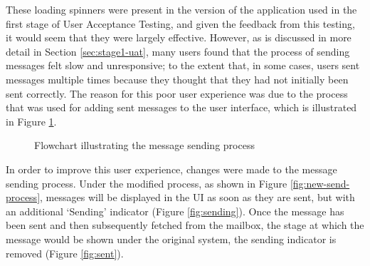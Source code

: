 These loading spinners were present in the version of the application used in the first stage of User Acceptance Testing, and given the feedback from this testing, it would seem that they were largely effective. However, as is discussed in more detail in Section \ref{sec:stage1-uat}, many users found that the process of sending messages felt slow and unresponsive; to the extent that, in some cases, users sent messages multiple times because they thought that they had not initially been sent correctly. The reason for this poor user experience was due to the process that was used for adding sent messages to the user interface, which is illustrated in Figure \ref{fig:send-process}.

\begin{figure}[h!]
  \begin{center}
    \caption{Flowchart illustrating the message sending process}
    \label{fig:send-process}
  \end{center}
\end{figure}

In order to improve this user experience, changes were made to the message sending process. Under the modified process, as shown in Figure \ref{fig:new-send-process}, messages will be displayed in the UI as soon as they are sent, but with an additional `Sending' indicator (Figure \ref{fig:sending}). Once the message has been sent and then subsequently fetched from the mailbox, the stage at which the message would be shown under the original system, the sending indicator is removed (Figure \ref{fig:sent}).

